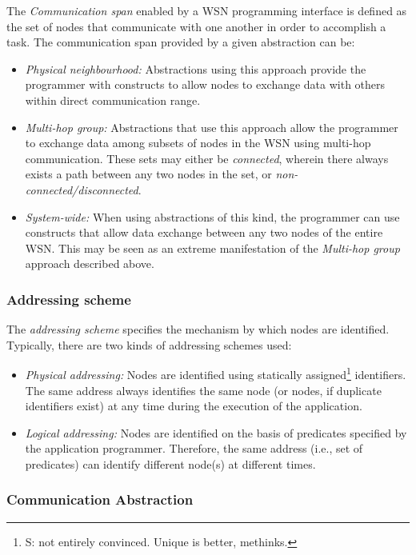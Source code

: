 The \emph{Communication span} enabled by a WSN programming interface is defined
as the set of nodes that communicate with one another in order to accomplish a
task. The communication span provided by a given abstraction can be:
\begin{itemize}
  \item \emph{Physical neighbourhood:} Abstractions using this approach provide
  the programmer with constructs to allow nodes to exchange data with others
  within direct communication range.
  \item \emph{Multi-hop group:} Abstractions that use this approach allow the
  programmer to exchange data among subsets of nodes in the WSN using
  multi-hop communication. These sets may either be
  \emph{connected}, wherein there always exists a path between any two nodes in
  the set, or \emph{non-connected/disconnected}.
  \item \emph{System-wide:} When using abstractions of this kind, the
  programmer can use constructs that allow data exchange between any two nodes
  of the entire WSN. This may be seen as an extreme manifestation of the
  \emph{Multi-hop group} approach described above.
\end{itemize}

\subsubsection{Addressing scheme}

The \emph{addressing scheme} specifies the mechanism by which nodes are
identified. Typically, there are two kinds of addressing schemes used:

\begin{itemize}
  \item \emph{Physical addressing:} Nodes are identified using statically
  assigned\footnote{S: not entirely convinced. Unique is better, methinks.}
  identifiers. The same address always identifies the same node (or nodes, if
  duplicate  identifiers exist) at any time during the execution of the
  application.
  \item \emph{Logical addressing:} Nodes are identified on the basis of
  predicates specified by the application programmer. Therefore, the same
  address (i.e., set of predicates) can identify different node(s) at different
  times.
\end{itemize}

\subsubsection{Communication Abstraction}

